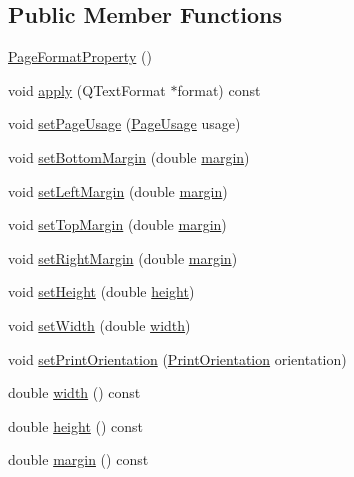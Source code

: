 \subsection*{Public Member Functions}
\begin{DoxyCompactItemize}
\item 
\hyperlink{classOOO_1_1PageFormatProperty_a46df8029d44ae9bdcde0ee9a198b0a6a}{Page\+Format\+Property} ()
\item 
void \hyperlink{classOOO_1_1PageFormatProperty_add51462a6804286cf556edd996983cdc}{apply} (Q\+Text\+Format $\ast$format) const 
\item 
void \hyperlink{classOOO_1_1PageFormatProperty_a5586d7da34d0754d855f32bdb3019712}{set\+Page\+Usage} (\hyperlink{classOOO_1_1PageFormatProperty_a3b4f1d357a8990fd17570f1154fb435f}{Page\+Usage} usage)
\item 
void \hyperlink{classOOO_1_1PageFormatProperty_ab4d948a7a2049359e8a3fcfccbb54051}{set\+Bottom\+Margin} (double \hyperlink{classOOO_1_1PageFormatProperty_ad391c36147f20feadc82455bcb6584e6}{margin})
\item 
void \hyperlink{classOOO_1_1PageFormatProperty_a51c91a95819dcb3c36d78928fb52df4d}{set\+Left\+Margin} (double \hyperlink{classOOO_1_1PageFormatProperty_ad391c36147f20feadc82455bcb6584e6}{margin})
\item 
void \hyperlink{classOOO_1_1PageFormatProperty_a64c2254563d2e9804e61db1548a72da2}{set\+Top\+Margin} (double \hyperlink{classOOO_1_1PageFormatProperty_ad391c36147f20feadc82455bcb6584e6}{margin})
\item 
void \hyperlink{classOOO_1_1PageFormatProperty_ae286df7abc4d3036ee6d5d2f21d7c65d}{set\+Right\+Margin} (double \hyperlink{classOOO_1_1PageFormatProperty_ad391c36147f20feadc82455bcb6584e6}{margin})
\item 
void \hyperlink{classOOO_1_1PageFormatProperty_a40c397c700cd4123f2dfb9a1e605a214}{set\+Height} (double \hyperlink{classOOO_1_1PageFormatProperty_a1fb932804dd6c21938168ed61a90ee50}{height})
\item 
void \hyperlink{classOOO_1_1PageFormatProperty_a44fd2f17068a6906070de9b8193959ee}{set\+Width} (double \hyperlink{classOOO_1_1PageFormatProperty_ac8731b7720187454433d2f518fd9c6ae}{width})
\item 
void \hyperlink{classOOO_1_1PageFormatProperty_a59888c94aa0ded43f898ef3540cab5eb}{set\+Print\+Orientation} (\hyperlink{classOOO_1_1PageFormatProperty_a89cc887141e802d6cfe6320c318a2a47}{Print\+Orientation} orientation)
\item 
double \hyperlink{classOOO_1_1PageFormatProperty_ac8731b7720187454433d2f518fd9c6ae}{width} () const 
\item 
double \hyperlink{classOOO_1_1PageFormatProperty_a1fb932804dd6c21938168ed61a90ee50}{height} () const 
\item 
double \hyperlink{classOOO_1_1PageFormatProperty_ad391c36147f20feadc82455bcb6584e6}{margin} () const 
\end{DoxyCompactItemize}



